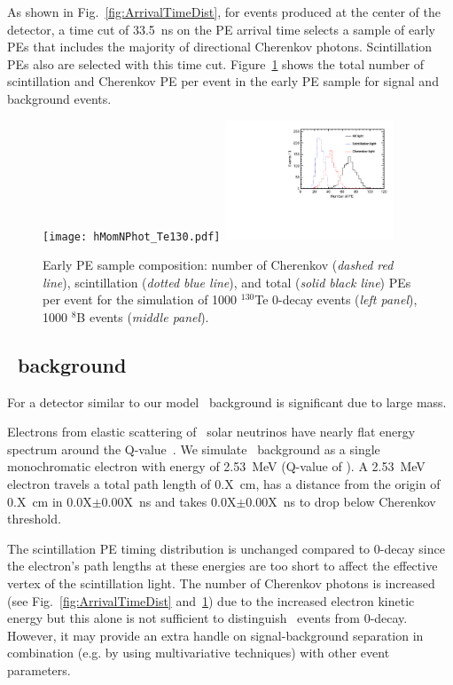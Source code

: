 As shown in Fig.~\ref{fig:ArrivalTimeDist}, for events produced at the center of the detector, a time cut of 33.5~ns on the PE arrival 
time selects a sample of early PEs that includes the majority of directional Cherenkov photons. Scintillation PEs also are 
selected with this time cut. Figure~\ref{fig:NPhotDist} shows the total number of scintillation and Cherenkov PE per event in the early 
PE sample for signal and background events.



\begin{figure}[ht]
  \centering
  \texttt{[image: hMomNPhot\_Te130.pdf]}
  \includegraphics[width=0.45\textwidth]{hMomNPhot_1el_2p529MeV.pdf}
  \caption{Early PE sample composition: number of Cherenkov (\emph{dashed red line}), scintillation
    (\emph{dotted blue line}), and total (\emph{solid black line}) PEs per event
    for the simulation of 1000 $^{130}$Te 0\nbb-decay events (\emph{left panel}),
    1000 $^8$B events (\emph{middle panel}).}%
\label{fig:NPhotDist}
\end{figure}



\subsection{\B~background}

For a detector similar to our model \B~background is significant due to large mass.

Electrons from elastic scattering of \B~solar neutrinos have nearly flat energy spectrum around the 
Q-value~\cite{SNOp-B8-bkg}. We simulate \B~background as a single monochromatic electron with energy of 2.53~MeV 
(Q-value of \Te). A 2.53~MeV electron travels a total path length of 0.X~cm, has a distance from the origin of 0.X~cm in 
0.0X$\pm$0.00X~ns  and takes 0.0X$\pm$0.00X~ns to drop below Cherenkov threshold.

The scintillation PE timing distribution is unchanged compared to 0\nbb-decay since the electron's path lengths at these energies 
are too short to affect the effective vertex of the scintillation light. The number of Cherenkov photons is increased 
(see Fig.~\ref{fig:ArrivalTimeDist} and~\ref{fig:NPhotDist}) due to the increased electron kinetic energy but this alone is not 
sufficient to distinguish \B~events from 0\nbb-decay. However, it may provide an extra handle on signal-background separation in 
combination (e.g. by using multivariative techniques) with other event parameters.

